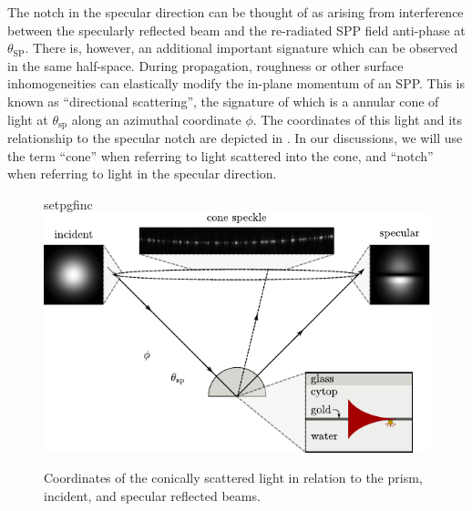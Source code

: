 The notch in the specular direction can be thought of as arising from 
interference between the specularly reflected beam and the
re-radiated SPP field anti-phase at $\theta_\mathrm{SP}$.  There
is, however, an additional important signature which can be observed in the
same half-space.  During propagation, roughness or other surface
inhomogeneities can elastically modify the in-plane momentum of an SPP.
This is known as ``directional scattering'', the signature of which is a
annular cone of light at $\theta_\mathrm{sp}$ along an azimuthal coordinate
$\phi$.  The coordinates of this light and its relationship to the specular
notch are depicted in .  In our 
discussions, we will use the term ``cone'' when referring to light scattered
into the cone, and ``notch'' when referring to light in the specular
direction.
\begin{figure}[ht]
 \centering
 {setpgfinc}
 \includegraphics{existence/figures/conefig}
 \caption{Coordinates of the conically scattered light in relation to the
 prism, incident, and specular reflected beams.}
 \label{fig:conefig}
\end{figure}

